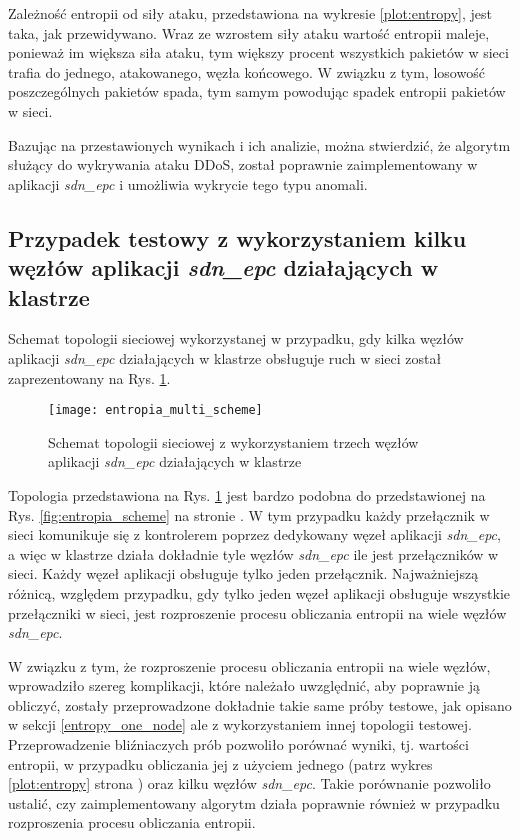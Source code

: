 Zależność entropii od siły ataku, przedstawiona na wykresie \ref{plot:entropy},
jest taka, jak przewidywano. Wraz ze wzrostem siły ataku wartość entropii
maleje, ponieważ im większa siła ataku, tym większy procent wszystkich pakietów
w sieci trafia do jednego, atakowanego, węzła końcowego. W związku z tym,
losowość poszczególnych pakietów spada, tym samym powodując spadek entropii
pakietów w sieci.

Bazując na przestawionych wynikach i ich analizie, można stwierdzić, że algorytm
służący do wykrywania ataku DDoS, został poprawnie zaimplementowany w aplikacji
\textit{sdn\_epc} i umożliwia wykrycie tego typu anomali. 

\subsection{Przypadek testowy z wykorzystaniem kilku węzłów aplikacji
  \textit{sdn\_epc} działających w klastrze} \label{entropy_multi_node}

Schemat topologii sieciowej wykorzystanej w przypadku, gdy kilka węzłów
aplikacji \textit{sdn\_epc} działających w klastrze obsługuje ruch w sieci
został zaprezentowany na Rys. \ref{fig:entropia_multi_scheme}.
\newpage

\begin{figure}[h]
\centering
\texttt{[image: entropia\_multi\_scheme]}
\caption{Schemat topologii sieciowej z wykorzystaniem trzech węzłów aplikacji
  \textit{sdn\_epc} działających w klastrze}
\label{fig:entropia_multi_scheme}
\end{figure}

Topologia przedstawiona na Rys. \ref{fig:entropia_multi_scheme} jest bardzo
podobna do przedstawionej na Rys. \ref{fig:entropia_scheme} na stronie
\pageref{fig:entropia_scheme}. W tym przypadku każdy przełącznik w sieci
komunikuje się z kontrolerem poprzez dedykowany węzeł aplikacji
\textit{sdn\_epc}, a więc w klastrze działa dokładnie tyle węzłów
\textit{sdn\_epc} ile jest przełączników w sieci. Każdy węzeł aplikacji
obsługuje tylko jeden przełącznik. Najważniejszą różnicą, względem przypadku,
gdy tylko jeden węzeł aplikacji obsługuje wszystkie przełączniki w sieci, jest
rozproszenie procesu obliczania entropii na wiele węzłów \textit{sdn\_epc}.

W związku z tym, że rozproszenie procesu obliczania entropii na wiele węzłów,
wprowadziło szereg komplikacji, które należało uwzględnić, aby poprawnie ją
obliczyć, zostały przeprowadzone dokładnie takie same próby testowe, jak opisano
w sekcji \ref{entropy_one_node} ale z wykorzystaniem innej topologii testowej.
Przeprowadzenie bliźniaczych prób pozwoliło porównać wyniki, tj. wartości
entropii, w przypadku obliczania jej z użyciem jednego (patrz wykres
\ref{plot:entropy} strona \pageref{plot:entropy}) oraz kilku węzłów
\textit{sdn\_epc}. Takie porównanie pozwoliło ustalić, czy zaimplementowany
algorytm działa poprawnie również w przypadku rozproszenia procesu obliczania
entropii.

